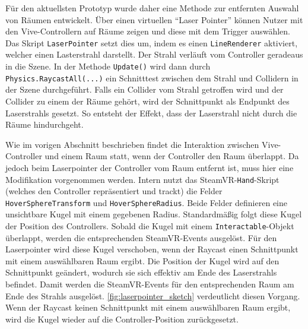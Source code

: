 Für den aktuellsten Prototyp wurde daher eine Methode zur entfernten Auswahl von Räumen entwickelt.
Über einen virtuellen \enquote{Laser Pointer} können Nutzer mit den Vive-Controllern auf Räume zeigen und diese mit dem Trigger auswählen.
Das Skript \lstinline|LaserPointer| setzt dies um, indem es einen \lstinline|LineRenderer| aktiviert, welcher einen Lasterstrahl darstellt.
Der Strahl verläuft vom Controller geradeaus in die Szene.
In der Methode \lstinline|Update()| wird dann durch \lstinline|Physics.RaycastAll(...)| ein Schnitttest zwischen dem Strahl und Collidern in der Szene durchgeführt.
Falls ein Collider vom Strahl getroffen wird und der Collider zu einem der Räume gehört, wird der Schnittpunkt als Endpunkt des Laserstrahls gesetzt.
So entsteht der Effekt, dass der Laserstrahl nicht durch die Räume hindurchgeht.

Wie im vorigen Abschnitt beschrieben findet die Interaktion zwischen Vive-Controller und einem Raum statt, wenn der Controller den Raum überlappt.
Da jedoch beim Laserpointer der Controller vom Raum entfernt ist, muss hier eine Modifikation vorgenommen werden.
Intern nutzt das SteamVR-\lstinline|Hand|-Skript (welches den Controller repräsentiert und trackt) die Felder \lstinline|HoverSphereTransform| und \lstinline|HoverSphereRadius|.
Beide Felder definieren eine unsichtbare Kugel mit einem gegebenen Radius.
Standardmäßig folgt diese Kugel der Position des Controllers.
Sobald die Kugel mit einem \lstinline|Interactable|-Objekt überlappt, werden die entsprechenden SteamVR-Events ausgelöst.
Für den Laserpointer wird diese Kugel verschoben, wenn der Raycast einen Schnittpunkt mit einem auswählbaren Raum ergibt.
Die Position der Kugel wird auf den Schnittpunkt geändert, wodurch sie sich effektiv am Ende des Laserstrahls befindet.
Damit werden die SteamVR-Events für den entsprechenden Raum am Ende des Strahls ausgelöst.
\autoref{fig:laserpointer_sketch} verdeutlicht diesen Vorgang.
Wenn der Raycast keinen Schnittpunkt mit einem auswählbaren Raum ergibt, wird die Kugel wieder auf die Controller-Position zurückgesetzt.

